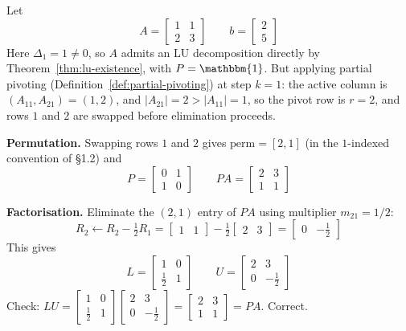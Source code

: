 		\begin{example}[Solving $Ax=b$ via $PA=LU$]
			\label{ex:solve-pa-lu-nontrivial}
			Let
			\[
				A = \begin{bmatrix} 1 & 1 \\ 2 & 3 \end{bmatrix} \qquad
				b = \begin{bmatrix} 2 \\ 5 \end{bmatrix}
			\]
			Here $\Delta_1 = 1 \neq 0$, so $A$ admits an LU decomposition directly by Theorem~\ref{thm:lu-existence}, with $P = \mathbbm{1}$. But applying partial pivoting (Definition~\ref{def:partial-pivoting}) at step $k=1$: the active column is $(A_{11},A_{21})=(1,2)$, and $|A_{21}|=2 > |A_{11}|=1$, so the pivot row is $r=2$, and rows $1$ and $2$ are swapped before elimination proceeds.
			
			\textbf{Permutation.} Swapping rows $1$ and $2$ gives $\mathrm{perm} = [2,1]$ (in the $1$-indexed convention of \S1.2) and
			\[
				P = \begin{bmatrix} 0 & 1 \\ 1 & 0 \end{bmatrix} \qquad 
				PA = \begin{bmatrix} 2 & 3 \\ 1 & 1 \end{bmatrix}
			\]
			
			\textbf{Factorisation.} Eliminate the $(2,1)$ entry of $PA$ using multiplier $m_{21} = 1/2$:
			\[
				R_2 \leftarrow R_2 - \tfrac12 R_1 = 
				\begin{bmatrix} 1 & 1 \end{bmatrix} - \tfrac12 \begin{bmatrix} 2 & 3 \end{bmatrix} = 
				\begin{bmatrix} 0 & -\tfrac12 \end{bmatrix}
			\]
			This gives
			\[
				L = 
				\begin{bmatrix} 1 & 0 \\ \tfrac12 & 1 \end{bmatrix} \qquad U = 
				\begin{bmatrix} 2 & 3 \\ 0 & -\tfrac12 \end{bmatrix}
			\]
			Check: $LU = \begin{bmatrix} 1 & 0 \\ \tfrac 12 & 1 \end{bmatrix}
			\begin{bmatrix} 2 & 3 \\ 0 & -\tfrac12 \end{bmatrix} = \begin{bmatrix} 2 & 3 \\ 1 & 1 \end{bmatrix} = PA$. Correct.
			

\end{example}
